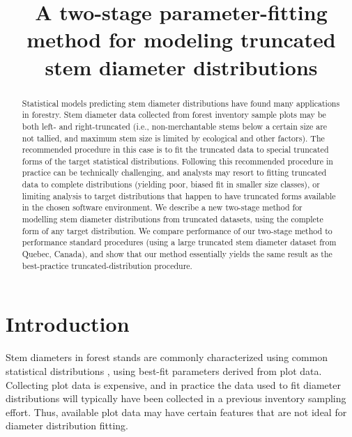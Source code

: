 \documentclass{article}
\title{A two-stage parameter-fitting method for modeling truncated stem diameter distributions}
\author{}
\date{}
\begin{document}
\maketitle

\begin{abstract}
  Statistical models predicting stem diameter distributions have found many applications in forestry.
  Stem diameter data collected from forest inventory sample plots may be both left- and right-truncated (i.e., non-merchantable stems below a certain size are not tallied, and maximum stem size is limited by ecological and other factors).
  The recommended procedure in this case is to fit the truncated data to special truncated forms of the target statistical distributions.
  Following this recommended procedure in practice can be technically challenging, and analysts may resort to fitting truncated data to complete distributions (yielding poor, biased fit in smaller size classes), or limiting analysis to target distributions that happen to have truncated forms available in the chosen software environment.
  We describe a new two-stage method for modelling stem diameter distributions from truncated datasets, using the complete form of any target distribution.
  We compare performance of our two-stage method to performance standard procedures (using a large truncated stem diameter dataset from Quebec, Canada), and show that our method essentially yields the same result as the best-practice truncated-distribution procedure.
\end{abstract}


\clearpage
\section{Introduction}
\label{sec:introduction}

Stem diameters in forest stands are commonly characterized using common statistical distributions \citep{bailey1973quantifying, hyink1983generalized}, using best-fit parameters derived from plot data.
Collecting plot data is expensive, and in practice  the data used to fit diameter distributions will typically have been collected in a previous inventory sampling effort.
Thus, available plot data may have certain features that are not ideal for diameter distribution fitting.
\end{document}
